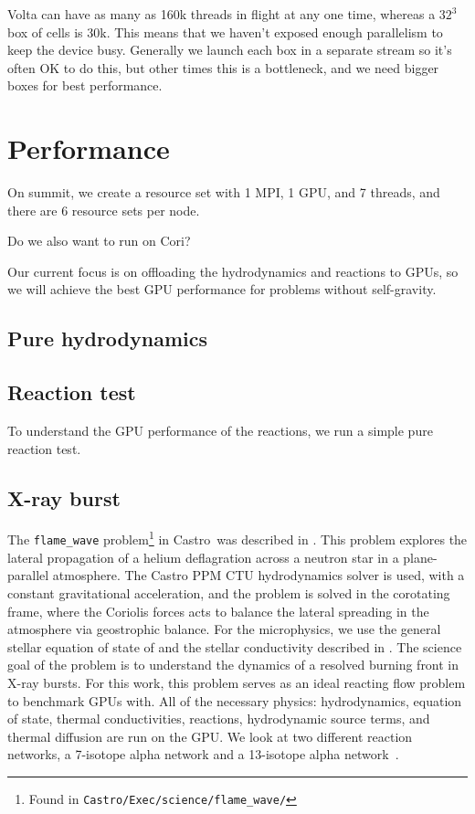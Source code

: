 \documentclass[twocolumn,times]{aastex62}
\newcommand{\castro}{{\sf Castro}}
\newcommand{\MarginPar}[1]{\marginpar{\vskip-\baselineskip\raggedright\tiny\sffamily\hrule\smallskip{\color{red}#1}\par\smallskip\hrule}}
\begin{document}
Volta can have as many as 160k threads in flight at any one time,
whereas a $32^3$ box of cells is 30k.  This means that we haven't
exposed enough parallelism to keep the device busy.  Generally we
launch each box in a separate stream so it's often OK to do this, but
other times this is a bottleneck, and we need bigger boxes for best
performance.

\section{Performance}

On summit, we create a resource set with 1 MPI, 1 GPU, and 7 threads,
and there are 6 resource sets per node.

Do we also want to run on Cori?

Our current focus is on offloading the hydrodynamics and reactions to
GPUs, so we will achieve the best GPU performance for problems without
self-gravity.

\subsection{Pure hydrodynamics}

\subsection{Reaction test}

To understand the GPU performance of the reactions, we run a simple pure reaction test.  \MarginPar{is this {\tt test\_react}?}

\subsection{X-ray burst}

The {\tt flame\_wave} problem\footnote{Found in {\tt Castro/Exec/science/flame\_wave/}} in \castro\ was described in
\cite{astronum:2018}.  This problem explores the lateral propagation
of a helium deflagration across a neutron star in a plane-parallel
atmosphere.  The Castro PPM CTU hydrodynamics solver is used, with a
constant gravitational acceleration, and the problem is solved in the
corotating frame, where the Coriolis forces acts to balance the
lateral spreading in the atmosphere via geostrophic balance.  For the
microphysics, we use the general stellar equation of state of
\citep{timmes_swesty:2000} and the stellar conductivity described in
\citep{Timmes00}.  The science goal of the problem is to understand the
dynamics of a resolved burning front in X-ray bursts.  For this work,
this problem serves as an ideal reacting flow problem to benchmark
GPUs with.  All of the necessary physics: hydrodynamics, equation of
state, thermal conductivities, reactions, hydrodynamic source terms,
and thermal diffusion are run on the GPU.  We look at two different
reaction networks, a 7-isotope alpha network and a 13-isotope alpha
network~\citep{iso7}.
\end{document}
